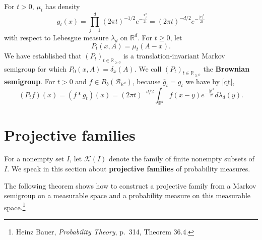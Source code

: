 \documentclass{article}
\theoremstyle{definition}
\theoremstyle{definition}
\begin{document}
For $t>0$, $\mu_t$ has density
\[
g_t(x) = \prod_{j=1}^d (2\pi t)^{-1/2} e^{-\frac{x_j^2}{2t}}
=(2\pi t)^{-d/2} e^{-\frac{|x|^2}{2t}}
\]
with respect to Lebesgue measure $\lambda_d$ on $\mathbb{R}^d$. 
For $t \geq 0$,
let
\[
P_t(x,A) = \mu_t(A-x).
\]
We have established that $(P_t)_{t \in \mathbb{R}_{\geq 0}}$ is a translation-invariant Markov semigroup
for which $P_0(x,A)=\delta_x(A)$. We call $(P_t)_{t \in \mathbb{R}_{\geq 0}}$ the \textbf{Brownian semigroup}.
For $t>0$ and $f \in B_b(\mathscr{B}_{\mathbb{R}^d})$,
because $\overline{g}_t=g_t$ we have by \eqref{qt},
\[
(P_t f)(x) = (f*g_t)(x) = 
(2\pi t)^{-d/2} \int_{\mathbb{R}^d} f(x-y) e^{-\frac{|y|^2}{2t}} d\lambda_d(y).
\]


\section{Projective families}
For a nonempty set $I$, let $\mathscr{K}(I)$ denote the family of finite nonempty subsets of $I$. 
We speak in this section about \textbf{projective families} of probability measures.


The following theorem shows how to construct a projective family from   a Markov semigroup on a measurable space and a probability measure
on this measurable space.\footnote{Heinz Bauer, {\em Probability Theory},
p.~314, Theorem 36.4.}
\end{document}
